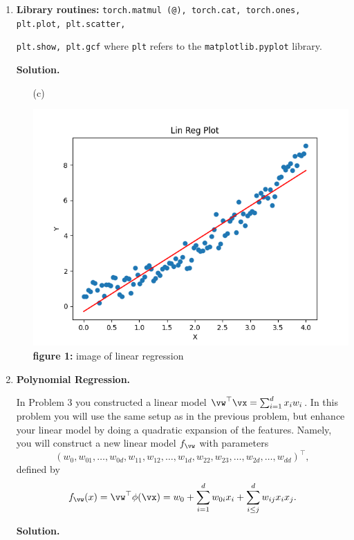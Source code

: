 \documentclass{article}
\theoremstyle{definition}
\theoremstyle{remark}
\newenvironment{Q}
{%
  \clearpage
  \item
  }
  {%
    \phantom{s} %
    \bigskip
    \textbf{Solution.}
  }
\begin{document}
\begin{enumerate}[font={\Large\bfseries},left=0pt]
\begin{Q}
\begin{enumerate}
          \textbf{Library routines:} \texttt{torch.matmul (@), torch.cat, torch.ones, plt.plot, plt.scatter,}

          \texttt{plt.show, plt.gcf} where \texttt{plt} refers to the \texttt{matplotlib.pyplot} library.
      \end{enumerate}
    \end{Q}
    \begin{enumerate}
    \item[(c)] \begin{center}
      \includegraphics[scale=0.55]{lin_reg.png}\\
      \textbf{figure 1:} image of linear regression\\  
    \end{center}
  \end{enumerate}
    

    \begin{Q}
  \textbf{\Large Polynomial Regression.}

  In Problem 3 you constructed a linear model $\vw^\top \vx = \sum_{i=1}^d x_i w_i$.  In this problem you will use the same setup as in the previous problem, but enhance your linear model by doing a quadratic expansion of the features.  Namely, you will construct a new linear model $f_{\vw}$ with parameters
  \[
    (w_{0}, w_{01},\dots,w_{0d},w_{11}, w_{12},\dots,w_{1d},w_{22}, w_{23},\dots,w_{2d},\dots, w_{dd})^\top,
  \]
    defined by
  	\begin{align*}
  	f_{\vw}(x) = \vw^\top \phi(\vx) = w_0 + \sum_{i=1}^d w_{0i} x_i + \sum_{i\leq j}^dw_{ij} x_ix_j.
  	\end{align*}
  	

\end{Q}
\end{enumerate}
\end{document}
